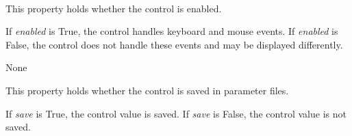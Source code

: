 \documentclass[letterpaper,10pt,english]{sphinxmanual}
\begin{document}
\begin{fulllineitems}
\label{api:controls.Shell}~

\begin{fulllineitems}
\label{api:controls.Shell.enabled}
This property holds whether the control is enabled.

If \emph{enabled} is True, the control handles keyboard and mouse events.
If \emph{enabled} is False, the control does not handle these events and may
be displayed differently.

\end{fulllineitems}


\begin{fulllineitems}
\label{api:controls.Shell.interact}
\end{fulllineitems}


\begin{fulllineitems}
\label{api:controls.Shell.message}
None

\end{fulllineitems}


\begin{fulllineitems}
\label{api:controls.Shell.push}
\end{fulllineitems}


\begin{fulllineitems}
\label{api:controls.Shell.resetbuffer}
\end{fulllineitems}


\begin{fulllineitems}
\label{api:controls.Shell.save}
This property holds whether the control is saved in parameter files.

If \emph{save} is True, the control value is saved.
If \emph{save} is False, the control value is not saved.


\end{fulllineitems}
\end{fulllineitems}
\end{document}
